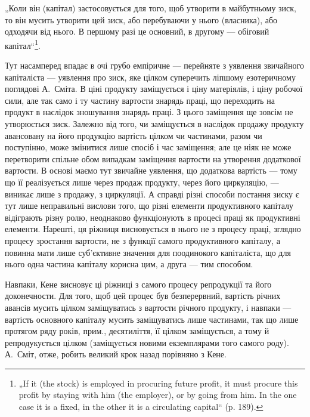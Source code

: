 „Коли він (капітал) застосовується для того, щоб утворити в майбутньому
зиск, то він мусить утворити цей зиск, або перебуваючи у
нього (власника), або одходячи від нього. В першому разі це основний,
в другому — обіговий капітал“\footnote*{
„If it (the stock) is employed in procuring future profit, it must procure this
profit by staying with him (the employer), or by going from him. In the one case
it is a fixed, in the other it is a circulating capital“ (p. 189).
}.

Тут насамперед впадає в очі грубо емпіричне — перейняте з уявлення
звичайного капіталіста — уявлення про зиск, яке цілком суперечить ліпшому
езотеричному поглядові А.~Сміта. В ціні продукту заміщується і ціну
матеріялів, і ціну робочої сили, але так само і ту частину вартости знарядь
праці, що переходить на продукт в наслідок зношування знарядь
праці. З цього заміщення ще зовсім не утворюється зиск. Залежно від
того, чи заміщується в наслідок продажу продукту авансовану на його
продукцію вартість цілком чи частинами, разом чи поступінно, може змінитися
лише спосіб і час заміщення; але це ніяк не може перетворити
спільне обом випадкам заміщення вартости на утворення додаткової вартости.
В основі маємо тут звичайне уявлення, що додаткова вартість —
тому що її реалізується лише через продаж продукту, через його циркуляцію,
— виникає лише з продажу, з циркуляції. А справді різні
способи постання зиску є тут лише неправильні вислови того, що різні
елементи продуктивного капіталу відіграють різну ролю, неоднаково
функціонують в процесі праці як продуктивні елементи. Нарешті, ця
ріжниця висновується в нього не з процесу праці, зглядно процесу зростання
вартости, не з функції самого продуктивного капіталу, а повинна
мати лише суб’єктивне значення для поодинокого капіталіста, що для
нього одна частина капіталу корисна цим, а друга — тим способом.

Навпаки, Кене висновує ці ріжниці з самого процесу репродукції
та його доконечности. Для того, щоб цей процес був безперервний,
вартість річних авансів мусить цілком заміщуватись з вартости річного
продукту, і навпаки — вартість основного капіталу мусить заміщуватись
лише частинами, так що лише протягом ряду років, прим., десятиліття,
її цілком заміщується, а тому й репродукується цілком (заміщується новими
екземплярами того самого роду). А.~Сміт, отже, робить великий
крок назад порівняно з Кене.

